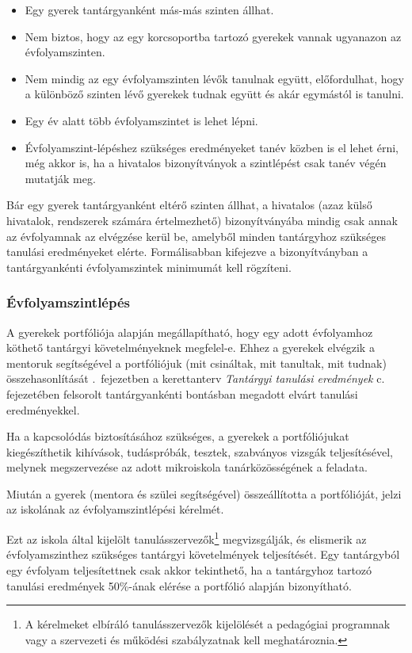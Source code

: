\begin{itemize}
      \item Egy gyerek tantárgyanként más-más szinten állhat.
      \item Nem biztos, hogy az egy korcsoportba tartozó gyerekek vannak ugyanazon az évfolyamszinten.

      \item Nem mindig az egy évfolyamszinten lévők tanulnak együtt, előfordulhat, hogy a különböző szinten lévő gyerekek tudnak együtt és akár egymástól is tanulni.

      \item Egy év alatt több évfolyamszintet is lehet lépni.
      \item Évfolyamszint-lépéshez szükséges eredményeket tanév közben is el lehet érni, még akkor is, ha a hivatalos bizonyítványok a szintlépést csak tanév végén mutatják meg.
\end{itemize}

Bár egy gyerek tantárgyanként eltérő szinten állhat, a hivatalos (azaz külső hivatalok, rendszerek számára értelmezhető) bizonyítványába mindig csak annak az évfolyamnak az elvégzése kerül be, amelyből minden tantárgyhoz szükséges tanulási eredményeket elérte. Formálisabban kifejezve a bizonyítványban a tantárgyankénti évfolyamszintek minimumát kell rögzíteni.

\subsubsection{Évfolyamszintlépés}
\label{sec:evfolyamszintlepes}
A gyerekek portfóliója alapján megállapítható, hogy egy adott évfolyamhoz köthető tantárgyi követelményeknek megfelel-e. Ehhez a gyerekek elvégzik a mentoruk segítségével a portfóliójuk (mit csináltak, mit tanultak, mit tudnak) összehasonlítását \ifkerettanterv
      .~fejezetben
\else
      a kerettanterv \emph{Tantárgyi tanulási eredmények} c. fejezetében
\fi felsorolt tantárgyankénti bontásban megadott elvárt tanulási eredményekkel.

Ha a kapcsolódás biztosításához szükséges, a gyerekek a portfóliójukat kiegészíthetik kihívások, tudáspróbák, tesztek, szabványos vizsgák teljesítésével, melynek megszervezése az adott mikroiskola tanárközösségének a feladata.

Miután a gyerek (mentora és szülei segítségével) összeállította a portfólió\-ját, jelzi az iskolának az évfolyamszintlépési kérelmét.

Ezt az iskola által kijelölt tanulásszervezők\footnote{A kérelmeket elbíráló tanulásszervezők kijelölését a pedagógiai programnak vagy a szervezeti és működési szabályzatnak kell meghatároznia.}   megvizsgálják, és elismerik az évfolyamszinthez szükséges tantárgyi követelmények teljesítését. Egy tantárgyból egy évfolyam teljesítettnek csak akkor tekinthető, ha a tantárgyhoz tartozó tanulási eredmények 50\%-ának elérése a portfólió alapján bizonyítható.

